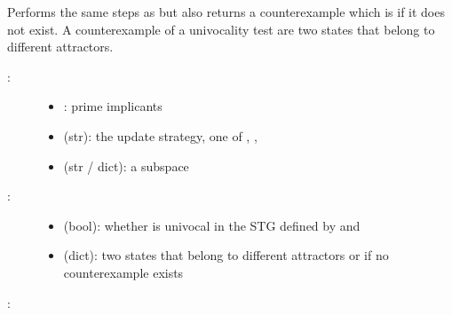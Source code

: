 \documentclass[letterpaper,10pt,english]{sphinxmanual}
\begin{document}
\begin{fulllineitems}
\label{\detokenize{Attractors:PyBoolNet.Attractors.univocality_with_counterexample}}
Performs the same steps as {\hyperref[\detokenize{Attractors:univocality}]{}} but also returns a counterexample which is  if it does not exist.
A counterexample of a univocality test are two states that belong to different attractors.
\begin{description}
\item[{:}] \leavevmode\begin{itemize}
\item {} 
: prime implicants

\item {} 
 (str): the update strategy, one of , , 

\item {} 
 (str / dict): a subspace

\end{itemize}

\item[{:}] \leavevmode\begin{itemize}
\item {} 
 (bool): whether  is univocal in the STG defined by  and 

\item {} 
 (dict): two states that belong to different attractors or  if no counterexample exists

\end{itemize}

\end{description}

:

\begin{sphinxVerbatim}[commandchars=\\\{\}]
   
  \PYG{p}{[}\PYG{p}{]}
     
\end{sphinxVerbatim}

\end{fulllineitems}
\end{document}
